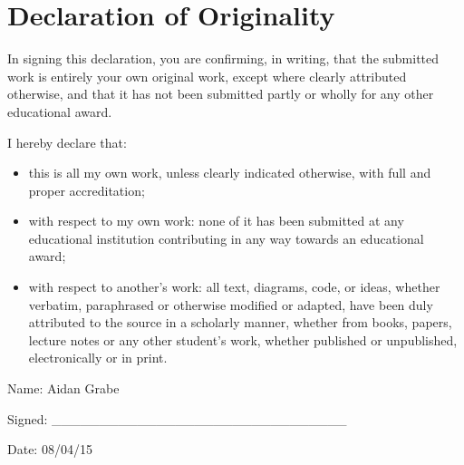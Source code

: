 \section*{Declaration of Originality}

In signing this declaration, you are confirming, in writing, that the submitted work is entirely your own original work, except where clearly attributed otherwise, and that it has not been submitted partly or wholly for any other educational award.

I hereby declare that:

\begin{itemize}
\item this is all my own work, unless clearly indicated otherwise, with full
    and proper accreditation; 

\item with respect to my own work: none of it has been submitted at any
    educational institution contributing in any way towards an educational
    award;

\item with respect to another’s work: all text, diagrams, code, or ideas,
    whether verbatim, paraphrased or otherwise modified or adapted, have been
    duly attributed to the source in a scholarly manner, whether from books,
    papers, lecture notes or any other student’s work, whether published or
    unpublished, electronically or in print. 
\end{itemize}

Name: Aidan Grabe

Signed: \_\_\_\_\_\_\_\_\_\_\_\_\_\_\_\_\_\_\_\_\_\_\_\_\_\_\_\_\_\_\_

Date: 08/04/15

\pagebreak
